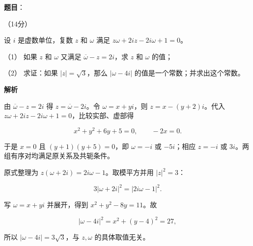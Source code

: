 \begin{answer}

\textbf{题目}：

（14分）

设 $i$ 是虚数单位，复数 $z$ 和 $\omega$ 满足 $z\omega+2iz-2i\omega+1=0$。

（1） 如果 $z$ 和 $\omega$ 又满足 $\overline\omega-z=2i$，求 $z$ 和 $\omega$ 的值；

（2） 求证：如果 $|z|=\sqrt3$，那么 $|\omega-4i|$ 的值是一个常数；并求出这个常数。

\textbf{解析}


由 $\overline\omega-z=2i$ 得 $z=\overline\omega-2i$。令 $\omega=x+yi$，则 $z=x-(y+2)i$。代入 $z\omega+2iz-2i\omega+1=0$，比较实部、虚部得

\nopagebreak[4]
\[x^2+y^2+6y+5=0,\qquad -2x=0.\]

于是 $x=0$ 且 $(y+1)(y+5)=0$，即 $\omega=-i$ 或 $-5i$；相应 $z=-i$ 或 $3i$。两组有序对均满足原关系及共轭条件。


原式整理为 $z(\omega+2i)=2i\omega-1$。取模平方并用 $|z|^2=3$：

\nopagebreak[4]
\[3|\omega+2i|^2=|2i\omega-1|^2.\]

写 $\omega=x+yi$ 并展开，得到 $x^2+y^2-8y=11$。故

\nopagebreak[4]
\[|\omega-4i|^2=x^2+(y-4)^2=27,\]

所以 $|\omega-4i|=3\sqrt3$，与 $z,\omega$ 的具体取值无关。



\end{answer}
